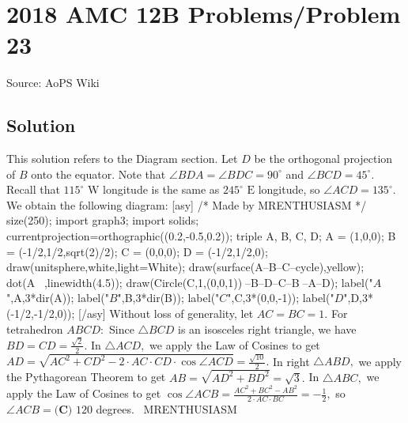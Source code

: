 \documentclass[12pt]{article}
\begin{document}
\section*{{2018 AMC 12B Problems/Problem 23}}
Source: AoPS Wiki

\subsection*{Solution}
This solution refers to the Diagram section. Let $D$ be the orthogonal projection of $B$ onto the equator. Note that $\angle BDA = \angle BDC = 90^\circ$ and $\angle BCD = 45^\circ.$ Recall that $115^\circ \text{ W}$ longitude is the same as $245^\circ \text{ E}$ longitude, so $\angle ACD=135^\circ.$ We obtain the following diagram: [asy] /* Made by MRENTHUSIASM */ size(250); import graph3; import solids; currentprojection=orthographic((0.2,-0.5,0.2)); triple A, B, C, D; A = (1,0,0); B = (-1/2,1/2,sqrt(2)/2); C = (0,0,0); D = (-1/2,1/2,0); draw(unitsphere,white,light=White); draw(surface(A--B--C--cycle),yellow); dot(A^^B^^C^^D,linewidth(4.5)); draw(Circle(C,1,(0,0,1))^^A--B--D--C--B^^C--A--D); label("$A$",A,3*dir(A)); label("$B$",B,3*dir(B)); label("$C$",C,3*(0,0,-1)); label("$D$",D,3*(-1/2,-1/2,0)); [/asy] Without loss of generality, let $AC=BC=1.$ For tetrahedron $ABCD:$ Since $\triangle BCD$ is an isosceles right triangle, we have $BD=CD=\frac{\sqrt2}{2}.$ In $\triangle ACD,$ we apply the Law of Cosines to get $AD=\sqrt{AC^2+CD^2-2\cdot AC\cdot CD\cdot\cos\angle ACD}=\frac{\sqrt{10}}{2}.$ In right $\triangle ABD,$ we apply the Pythagorean Theorem to get $AB=\sqrt{AD^2+BD^2}=\sqrt{3}.$ In $\triangle ABC,$ we apply the Law of Cosines to get $\cos\angle ACB=\frac{AC^2+BC^2-AB^2}{2\cdot AC\cdot BC}=-\frac12,$ so $\angle ACB=\boxed{\textbf{(C) }120}$ degrees. ~MRENTHUSIASM
\end{document}

